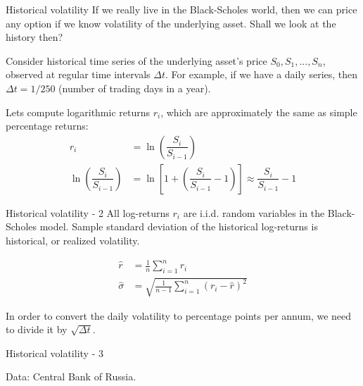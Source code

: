 \documentclass{beamer}
\begin{document}
\begin{frame}{Historical volatility}
\justify
If we really live in the Black-Scholes world, then we can price any option if we know volatility of the underlying asset. Shall we look at the history then?

\justify
Consider historical time series of the underlying asset's price $S_0,S_1,...,S_n$, observed at regular time intervals $\Delta t$. For example, if we have a daily series, then $\Delta t = 1/250$ (number of trading days in a year). 

\justify
Lets compute logarithmic returns $r_i$, which are approximately the same as simple percentage returns:
\begin{align*}
r_i &= \ln \left( \dfrac{S_{i}}{S_{i-1}} \right) \\
\ln \left(\dfrac{S_{i}}{S_{i-1}} \right) &= \ln \left[1 + \left(\dfrac{S_{i}}{S_{i-1}} - 1 \right) \right] \approx \dfrac{S_{i}}{S_{i-1}} - 1
\end{align*}
\end{frame}



\begin{frame}{Historical volatility - 2}
\justify
All log-returns $r_i$ are i.i.d. random variables in the Black-Scholes model. Sample standard deviation of the historical log-returns is  \alert{historical}, or \alert{realized} volatility.

\begin{align*}
\hat{r} &= \frac{1}{n}\sum\limits_{i=1}^{n}r_i \\
\hat{\sigma} &= \sqrt{\frac{1}{n-1}\sum\limits_{i=1}^{n}(r_i - \hat{r})^2}
\end{align*}

\justify
In order to convert the daily volatility to percentage points per annum, we need to divide it by $\sqrt{\Delta t}$.
\end{frame}



\begin{frame}{Historical volatility - 3}
\centering
{}

\scriptsize Data: Central Bank of Russia.
\end{frame}
\end{document}
